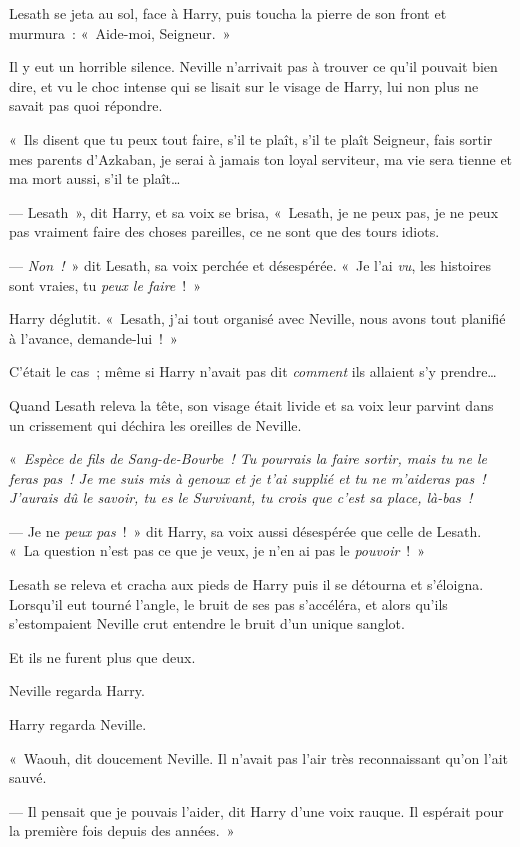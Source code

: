 Lesath se jeta au sol, face à Harry, puis toucha la pierre de son front et murmura~: «~Aide-moi, Seigneur.~»

Il y eut un horrible silence.
Neville n'arrivait pas à trouver ce qu'il pouvait bien dire, et vu le choc intense qui se lisait sur le visage de Harry, lui non plus ne savait pas quoi répondre.

«~Ils disent que tu peux tout faire, s'il te plaît, s'il te plaît Seigneur, fais sortir mes parents d'Azkaban, je serai à jamais ton loyal serviteur, ma vie sera tienne et ma mort aussi, s'il te plaît…

--- Lesath~», dit Harry, et sa voix se brisa, «~Lesath, je ne peux pas, je ne peux pas vraiment faire des choses pareilles, ce ne sont que des tours idiots.

--- \emph{Non~!}~» dit Lesath, sa voix perchée et désespérée.
«~Je l'ai \emph{vu}, les histoires sont vraies, tu \emph{peux le faire}~!~»

Harry déglutit.
«~Lesath, j'ai tout organisé avec Neville, nous avons tout planifié à l'avance, demande-lui~!~»

C'était le cas~; même si Harry n'avait pas dit \emph{comment} ils allaient s'y prendre…

Quand Lesath releva la tête, son visage était livide et sa voix leur parvint dans un crissement qui déchira les oreilles de Neville.

«~\emph{Espèce de fils de Sang-de-Bourbe~!
Tu pourrais la faire sortir, mais tu ne le feras pas~!
Je me suis mis à genoux et je t'ai supplié et tu ne m'aideras pas~!
J'aurais dû le savoir, tu es le Survivant, tu crois que c'est sa place, là-bas~!}

--- Je ne \emph{peux pas}~!~»
dit Harry, sa voix aussi désespérée que celle de Lesath.
«~La question n'est pas ce que je veux, je n'en ai pas le \emph{pouvoir}~!~»

Lesath se releva et cracha aux pieds de Harry puis il se détourna et s'éloigna.
Lorsqu'il eut tourné l'angle, le bruit de ses pas s'accéléra, et alors qu'ils s'estompaient Neville crut entendre le bruit d'un unique sanglot.

Et ils ne furent plus que deux.

Neville regarda Harry.

Harry regarda Neville.

«~Waouh, dit doucement Neville.
Il n'avait pas l'air très reconnaissant qu'on l'ait sauvé.

--- Il pensait que je pouvais l'aider, dit Harry d'une voix rauque.
Il espérait pour la première fois depuis des années.~»

